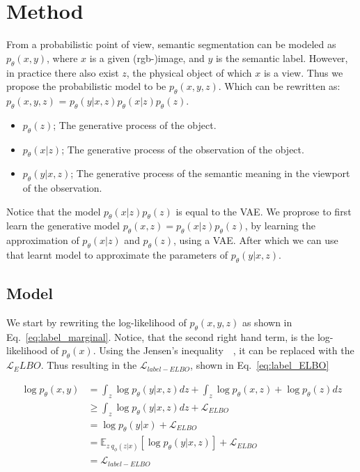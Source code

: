 \chapter{Method}\label{chapter:first_real_chapter}
From a probabilistic point of view, semantic segmentation can be modeled as $p_\theta(x,y)$, where $x$ is a given (rgb-)image, and $y$ is the semantic label. However, in practice there also exist $z$, the physical object of which $x$ is a view. Thus we propose the probabilistic model to be $p_\theta(x,y,z)$. Which can be rewritten as: $p_\theta(x,y,z)$ = $p_\theta(y|x,z) p_\theta(x|z) p_\theta(z)$.
\begin{itemize}
    \item $p_\theta(z)$; The generative process of the object.
    \item $p_\theta(x|z)$; The generative process of the observation of the object.
    \item $p_\theta(y|x,z)$; The generative process of the semantic meaning in the viewport of the observation.
\end{itemize}
Notice that the model $p_\theta(x|z) p_\theta(z)$ is equal to the VAE. We proprose to first learn the generative model $p_\theta(x,z) = p_\theta(x|z) p_\theta(z)$, by learning the approximation of $p_\theta(x|z)$ and $p_\theta(z)$, using a VAE. After which we can use that learnt model to approximate the parameters of $p_\theta(y|x,z)$.

\section{Model}
We start by rewriting the log-likelihood of $p_\theta(x, y, z)$ as shown in Eq.~\ref{eq:label_marginal}. Notice, that the second right hand term, is the log-likelihood of $p_\theta(x)$. Using the Jensen's inequality~~\cite{jensen1906fonctions}, it can be replaced with the $\mathcal{L}_ELBO$. Thus resulting in the $\mathcal{L}_{label-ELBO}$, shown in Eq.~\ref{eq:label_ELBO}

\begin{subequations}
    \begin{align}
        \log p_\theta(x, y) & = \int_z \log p_\theta(y | x, z) dz +  \int_z \log p_\theta(x, z) + \log p_\theta(z) dz             \label{eq:label_marginal} \\
                            & \geq \int_z \log p_\theta(y | x, z) dz + \mathcal{L}_{ELBO}                                                                   \\
                            & = \log p_\theta(y | x) + \mathcal{L}_{ELBO}                                                                                   \\
                            & = \mathbb{E}_{z~q_{\phi}(z | x)}[\log p_\theta(y|x, z)] + \mathcal{L}_{ELBO}                                                  \\
                            & = \mathcal{L}_{label-ELBO} \label{eq:label_ELBO}
    \end{align}
\end{subequations}

